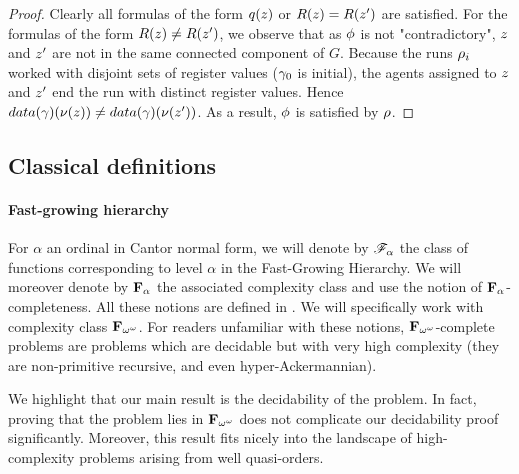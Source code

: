 \begin{proof}
	
	Clearly all formulas of the form $q(\varz)$ or $R(\varz) = R(\varz')$ are satisfied.
	For the formulas of the form $R(\varz) \neq R(\varz')$, we observe that as $\phi$ is not "contradictory", $\varz$ and $\varz'$ are not in the same connected component of $G$. Because the runs $\rho_i$ worked with disjoint sets of register values ($\gamma_0$ is initial), the agents assigned to $\varz$ and $\varz'$ end the run with distinct register values.
	Hence $\data{\config}(\nu(\varz)) \neq \data{\config}(\nu(\varz'))$. As a result, $\phi$ is satisfied by $\rho$.
\end{proof}
\fi
\fi


\subsection{Classical definitions}

\paragraph*{Fast-growing hierarchy}

For $\alpha$ an ordinal in Cantor normal form, we will denote by $\mathscr{F}_{\alpha}$ the class of functions corresponding to level $\alpha$ in the Fast-Growing Hierarchy. We will moreover denote by $\mathbf{F}_{\alpha}$ the associated complexity class and use the notion of $\mathbf{F}_{\alpha}$-completeness. All these notions are defined in \cite{Schmitz13}. We will specifically work with complexity class $\mathbf{F}_{\omega^{\omega}}$. For readers unfamiliar with these notions, $\mathbf{F}_{\omega^{\omega}}$-complete problems are problems which are decidable but with very high complexity (they are non-primitive recursive, and even hyper-Ackermannian). 

We highlight that our main result is the decidability of the problem. In fact, proving that the problem lies in $\mathbf{F}_{\omega^{\omega}}$ does not complicate our decidability proof significantly. Moreover, this result fits nicely into the landscape of high-complexity problems arising from well quasi-orders. 

